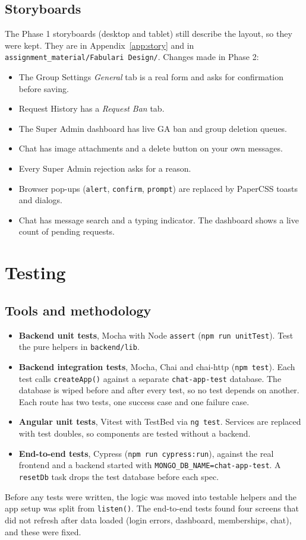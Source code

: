 \documentclass[10pt,a4paper]{article}
\newcommand{\ep}[1]{\texttt{\small #1}}
\begin{document}
\subsection{Storyboards}
The Phase 1 storyboards (desktop and tablet) still describe the layout, so they were kept. They are in Appendix~\ref{app:story} and in \ep{assignment\_material/Fabulari Design/}. Changes made in Phase 2:
\begin{itemize}
\item The Group Settings \textit{General} tab is a real form and asks for confirmation before saving.
\item Request History has a \textit{Request Ban} tab.
\item The Super Admin dashboard has live GA ban and group deletion queues.
\item Chat has image attachments and a delete button on your own messages.
\item Every Super Admin rejection asks for a reason.
\item Browser pop-ups (\ep{alert}, \ep{confirm}, \ep{prompt}) are replaced by PaperCSS toasts and dialogs.
\item Chat has message search and a typing indicator. The dashboard shows a live count of pending requests.
\end{itemize}

\section{Testing}
\subsection{Tools and methodology}
\begin{itemize}
\item \textbf{Backend unit tests}, Mocha with Node \ep{assert} (\ep{npm run unitTest}). Test the pure helpers in \ep{backend/lib}.
\item \textbf{Backend integration tests}, Mocha, Chai and chai-http (\ep{npm test}). Each test calls \ep{createApp()} against a separate \ep{chat-app-test} database. The database is wiped before and after every test, so no test depends on another. Each route has two tests, one success case and one failure case.
\item \textbf{Angular unit tests}, Vitest with TestBed via \ep{ng test}. Services are replaced with test doubles, so components are tested without a backend.
\item \textbf{End-to-end tests}, Cypress (\ep{npm run cypress:run}), against the real frontend and a backend started with \ep{MONGO\_DB\_NAME=chat-app-test}. A \ep{resetDb} task drops the test database before each spec.
\end{itemize}
Before any tests were written, the logic was moved into testable helpers and the app setup was split from \ep{listen()}. The end-to-end tests found four screens that did not refresh after data loaded (login errors, dashboard, memberships, chat), and these were fixed.
\end{document}
